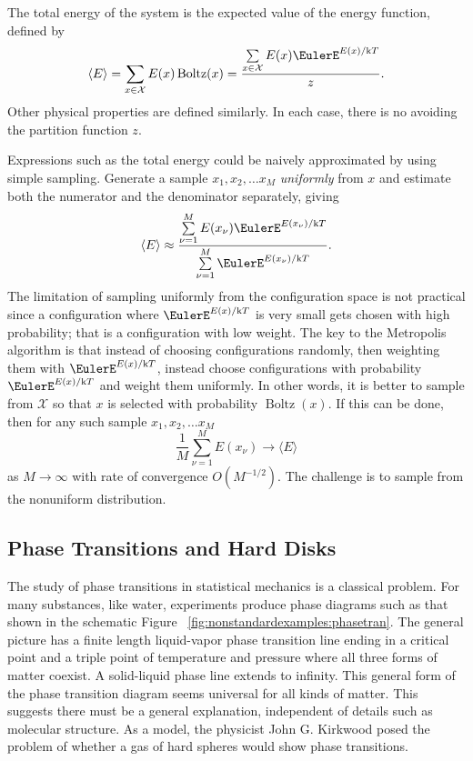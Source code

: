 \documentclass[12pt]{article}
\begin{document}
The total energy of the system is the expected value of the energy
function, defined by
\[
    \langle E\rangle = \sum\limits_{x \in \mathcal{X}} E(x)
    \operatorname{Boltz}
    (x) = \frac{\sum\limits_{x \in \mathcal{X}} E(x) \EulerE^{E (x)/\mathrm
    {k}T}}{z}.
\] Other physical properties are defined similarly.  In each case, there
is no avoiding the partition function \( z \).

Expressions such as the total energy could be naively approximated by
using simple sampling.  Generate a sample \( x_1, x_2, \dots x_M \)
\emph{uniformly} from \( x \) and estimate both the numerator and the
denominator separately, giving
\[
    \langle E\rangle \approx \frac{\sum\limits_{\nu=1}^M E(x_\nu)\EulerE^
    {E(x_{\nu})/\mathrm{k}T}}{\sum\limits_{\nu=1}^M \EulerE^{E(x_{\nu})/\mathrm
    {k}T}}.
\] The limitation of sampling uniformly from the configuration space is
not practical since a configuration where \( \EulerE^{E(x)/\mathrm{k}T} \)
is very small gets chosen with high probability; that is a configuration
with low weight.%
The key to the Metropolis algorithm is that instead of choosing
configurations randomly, then weighting them with \( \EulerE^{E(x)/\mathrm
{k}T} \), instead choose configurations with probability \( \EulerE^{E(x)/\mathrm
{k}T} \) and weight them uniformly.  In other words, it is better to
sample from \( \mathcal{X} \) so that \( x \) is selected with
probability \(
\operatorname{Boltz}
(x) \).  If this can be done, then for any such sample \( x_1, x_2,
\dots x_M \)
\[
    \frac{1}{M} \sum\limits_{\nu=1}^M E(x_\nu) \to \langle E \rangle
\] as \( M \to \infty \) with rate of convergence \( O(M^{-1/2}) \).
The challenge is to sample from the nonuniform distribution.

\subsection*{Phase Transitions and Hard Disks}

The study of phase transitions in statistical mechanics is a classical
problem.%
For many substances, like water, experiments produce phase diagrams such
as that shown in the schematic Figure~%
\ref{fig:nonstandardexamples:phasetran}.  The general picture has a
finite length liquid-vapor phase transition line ending in a critical
point and a triple point of temperature and pressure where all three
forms of matter coexist.  A solid-liquid phase line extends to infinity.
This general form of the phase transition diagram seems universal for
all kinds of matter.  This suggests there must be a general explanation,
independent of details such as molecular structure. As a model, the
physicist John G. Kirkwood posed the problem of whether a gas of hard
spheres would show phase transitions.
\end{document}
